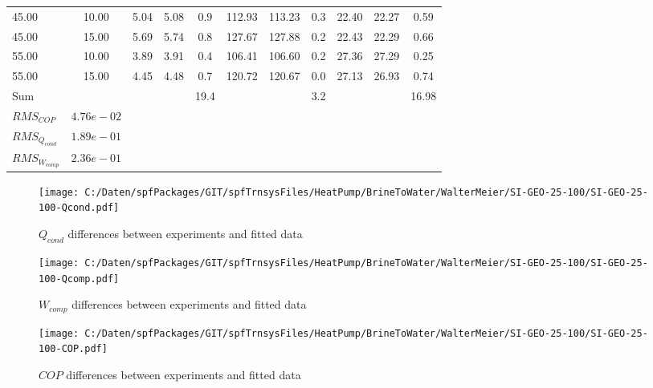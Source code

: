 \documentclass[english]{SPFShortReport}
\begin{document}
\begin{table}[!ht]
\begin{small}
\begin{center}
{\begin{tabular}{l | c c c c c c c c c c }
45.00  & 10.00 & 5.04 & 5.08 & 0.9 & 112.93 & 113.23 & 0.3 & 22.40 & 22.27 & 0.59\\ 
45.00  & 15.00 & 5.69 & 5.74 & 0.8 & 127.67 & 127.88 & 0.2 & 22.43 & 22.29 & 0.66\\ 
55.00  & 10.00 & 3.89 & 3.91 & 0.4 & 106.41 & 106.60 & 0.2 & 27.36 & 27.29 & 0.25\\ 
55.00  & 15.00 & 4.45 & 4.48 & 0.7 & 120.72 & 120.67 & 0.0 & 27.13 & 26.93 & 0.74\\ 
\hline 
 Sum &  & &  & 19.4 &  &  & 3.2 & &  & 16.98\\ 
\hline 
 $RMS_{COP}$ & $4.76e-02$ \\ 
 $RMS_{Q_{cond}}$ & $1.89e-01$ \\ 
 $RMS_{W_{comp}}$ & $2.36e-01$ \\ 
\hline
\hline
\end{tabular}
}
\label{ErrorsTable}
\end{center}
\end{small}
\end{table}
\begin{figure}[!ht]
\begin{center}
\texttt{[image: C:/Daten/spfPackages/GIT/spfTrnsysFiles/HeatPump/BrineToWater/WalterMeier/SI-GEO-25-100/SI-GEO-25-100-Qcond.pdf]}
\caption{$Q_{cond}$ differences between experiments and fitted data}
\label{QcongFig}
\end{center}
\end{figure}
\begin{figure}[!ht]
\begin{center}
\texttt{[image: C:/Daten/spfPackages/GIT/spfTrnsysFiles/HeatPump/BrineToWater/WalterMeier/SI-GEO-25-100/SI-GEO-25-100-Qcomp.pdf]}
\caption{$W_{comp}$ differences between experiments and fitted data}
\label{QcompFig}
\end{center}
\end{figure}
\begin{figure}[!ht]
\begin{center}
\texttt{[image: C:/Daten/spfPackages/GIT/spfTrnsysFiles/HeatPump/BrineToWater/WalterMeier/SI-GEO-25-100/SI-GEO-25-100-COP.pdf]}
\caption{$COP$ differences between experiments and fitted data}
\label{COPFig}
\end{center}
\end{figure}
\end{document}

